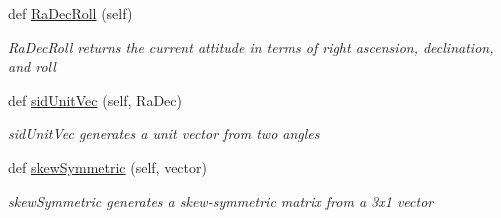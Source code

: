 \begin{DoxyCompactItemize}
def \hyperlink{classAttitudeSubstate_1_1AttitudeState6DOF_a4728d7547aee8612fdd5e2875a37f8a2}{Ra\+Dec\+Roll} (self)
\begin{DoxyCompactList}\small\item\em Ra\+Dec\+Roll returns the current attitude in terms of right ascension, declination, and roll \end{DoxyCompactList}\item 
def \hyperlink{classAttitudeSubstate_1_1AttitudeState6DOF_ae5afc5e0352e10e5c11e45d5b3fa8f4e}{sid\+Unit\+Vec} (self, Ra\+Dec)
\begin{DoxyCompactList}\small\item\em sid\+Unit\+Vec generates a unit vector from two angles \end{DoxyCompactList}\item 
def \hyperlink{classAttitudeSubstate_1_1AttitudeState6DOF_afe4e6f5ef09bd1fab2e390f3748af76a}{skew\+Symmetric} (self, vector)
\begin{DoxyCompactList}\small\item\em skew\+Symmetric generates a skew-\/symmetric matrix from a 3x1 vector \end{DoxyCompactList}\end{DoxyCompactItemize}
